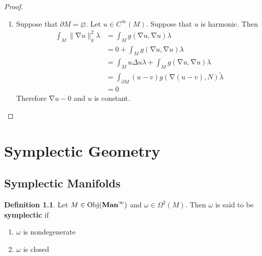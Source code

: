 \documentclass{book}
\theoremstyle{definition}
\newtheorem{defn}[definition]{Definition}
\newcommand{\lam}{\lambda}
\newcommand{\om}{\omega}
\newcommand{\Del}{\Delta}
\newcommand{\Om}{\Omega}
\DeclareMathOperator{\Obj}{Obj}
\DeclareMathOperator{\nab}{\nabla}
\DeclareMathOperator*{\Maninf}{\text{\tbf{Man}}^{\infty}}
\DeclareMathOperator*{\0}{\mbf{0}}
\DeclareMathOperator*{\1}{\mbf{1}}
\newcommand{\tbf}[1]{\textbf{#1}}
\newcommand{\p}{\partial}
\begin{document}
\begin{proof}
\begin{enumerate}
\begin{enumerate}
			\item Suppose that $\p M = \varnothing$. Let $u \in C^{\infty}(M)$. Suppose that $u$ is harmonic. Then
			\begin{align*}
				\int_M \|\nab u\|_g^2 \lam 
				& = \int_M g(\nab u, \nab u) \lam \\
				& = 0 + \int_M g(\nab u, \nab u) \lam \\
				& = \int_{M} u \Del u \lam + \int_M g(\nab u, \nab u) \lam \\
				& = \int_{\p M} (u-v) g(\nab (u-v), N) \tilde{\lam} \\
				& = 0
			\end{align*}
			Therefore $\nab u - 0$ and $u$ is constant.
		\end{enumerate}
	\end{enumerate}
\end{proof}



















	\newpage
	\chapter{Symplectic Geometry}
	
	
	
	
	
	
	
	
	
	
	
	
	
	
	
	
	
	
	
	
	
	
	
	
	
	
	
	\newpage
	\section{Symplectic Manifolds}
	
	\begin{defn}
		Let $M \in \Obj(\Maninf)$ and $\om \in \Om^2(M)$. Then $\om$ is said to be \tbf{symplectic} if 
		\begin{enumerate}
			\item $\om$ is nondegenerate
			\item $\om$ is closed
		\end{enumerate} 
	\end{defn}
	
\end{document}
